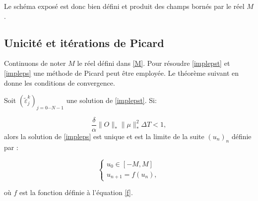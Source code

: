 Le schéma exposé est donc bien défini et produit des champs bornés par le réel $M$ .

\subsection{Unicité et itérations de Picard}
Continuons de noter $M$ le réel défini dans \eqref{M}. Pour résoudre \eqref{implepst} et \eqref{impleps} une méthode de Picard peut être employée. Le théorème suivant en donne les conditions de convergence.

\begin{theorem} \label{theopicard}
	Soit $(\tilde{\varepsilon}_j^k)_{j = 0\cdots N-1}$ une solution de \eqref{implepst}. Si:
	
	\begin{equation} \label{cond2.26}
	\frac{\delta}{\alpha} \lVert O\rVert_* \lVert \mu \rVert^2_* \Delta T < 1,
	\end{equation}
	alors la solution de \eqref{impleps} est unique et est la limite de la suite $(u_n )_n$ définie par :
	
	\begin{equation}
	\begin{cases}
	u_0 \in [-M,M]\\
	u_{n+1} = f(u_n),
	\end{cases}
	\end{equation}
	
	où $f$ est la fonction définie à l'équation \eqref{f}.
	
\end{theorem}

